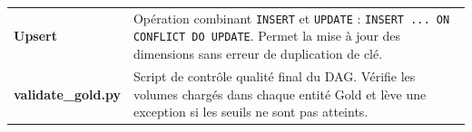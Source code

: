 \documentclass[12pt,a4paper]{report}
\begin{document}
\begin{longtable}{@{} p{3.8cm} p{10.8cm} @{}}
\textbf{Upsert} &
    Opération combinant \texttt{INSERT} et \texttt{UPDATE} :
    \texttt{INSERT ... ON CONFLICT DO UPDATE}. Permet la mise à jour des
    dimensions sans erreur de duplication de clé. \\[4pt]

\textbf{validate\_gold.py} &
    Script de contrôle qualité final du DAG. Vérifie les volumes chargés
    dans chaque entité Gold et lève une exception si les seuils ne sont pas
    atteints. \\[4pt]

\bottomrule
\end{longtable}
\end{document}
